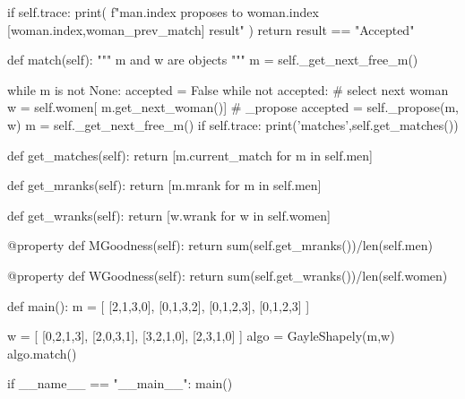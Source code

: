 \documentclass{homeworg}
\begin{document}
\begin{python}
        if self.trace:
            print(
                f"{man.index} proposes to {woman.index} [{woman.index},{woman_prev_match}] {result}"
            )
        return result == "Accepted"

    def match(self):
        """
        m and w are objects
        """
        m = self._get_next_free_m()
        
        while m is not None:
            accepted = False
            while not accepted:
                # select next woman
                w = self.women[ m.get_next_woman()]
                # _propose
                accepted = self._propose(m, w)
            m = self._get_next_free_m()
        if self.trace:
            print('matches\n',self.get_matches())

    def get_matches(self):
        return [m.current_match for m in self.men]

    def get_mranks(self):
        return [m.mrank for m in self.men]
    
    
    def get_wranks(self):
        return [w.wrank for w in self.women]

    @property
    def MGoodness(self):
        return sum(self.get_mranks())/len(self.men)
    
    @property
    def WGoodness(self):
        return sum(self.get_wranks())/len(self.women)

def main():
    m = [
        [2,1,3,0],
        [0,1,3,2],
        [0,1,2,3],
        [0,1,2,3]
    ]

    w = [
        [0,2,1,3],
        [2,0,3,1],
        [3,2,1,0],
        [2,3,1,0]
    ]
    algo = GayleShapely(m,w)
    algo.match()

if __name__ == "__main__":
    main()
\end{python}

\newpage

\exercise
\end{document}
